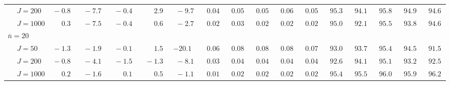 \begin{sidewaystable}
\begin{threeparttable}
\begin{tabular}{llccccccccccccccc}
 & \nopagebreak $\;J=200$  & $\phantom{0}{-}0.8\phantom{0}$ & $\phantom{0}{-}7.7\phantom{0}$ & $\phantom{0}{-}0.4\phantom{0}$ & $\phantom{0}\phantom{-}2.9\phantom{0}$ & $\phantom{0}{-}9.7\phantom{0}$ & $\phantom{0}0.04\phantom{0}$ & $\phantom{0}0.05\phantom{0}$ & $\phantom{0}0.05\phantom{0}$ & $\phantom{0}0.06\phantom{0}$ & $\phantom{0}0.05\phantom{0}$ & $\phantom{0}95.3\phantom{0}$ & $\phantom{0}94.1\phantom{0}$ & $\phantom{0}95.8\phantom{0}$ & $\phantom{0}94.9\phantom{0}$ & $\phantom{0}94.6\phantom{0}$ \\
 & \nopagebreak $\;J=1000$  & $\phantom{0}\phantom{-}0.3\phantom{0}$ & $\phantom{0}{-}7.5\phantom{0}$ & $\phantom{0}{-}0.4\phantom{0}$ & $\phantom{0}\phantom{-}0.6\phantom{0}$ & $\phantom{0}{-}2.7\phantom{0}$ & $\phantom{0}0.02\phantom{0}$ & $\phantom{0}0.03\phantom{0}$ & $\phantom{0}0.02\phantom{0}$ & $\phantom{0}0.02\phantom{0}$ & $\phantom{0}0.02\phantom{0}$ & $\phantom{0}95.0\phantom{0}$ & $\phantom{0}92.1\phantom{0}$ & $\phantom{0}95.5\phantom{0}$ & $\phantom{0}93.8\phantom{0}$ & $\phantom{0}94.6\phantom{0}$ \\
\multicolumn{4}{l}{$\bar{n}=20$} \\  & \nopagebreak $\;J=50$  & $\phantom{0}{-}1.3\phantom{0}$ & $\phantom{0}{-}1.9\phantom{0}$ & $\phantom{0}{-}0.1\phantom{0}$ & $\phantom{0}\phantom{-}1.5\phantom{0}$ & ${-}20.1\phantom{0}$ & $\phantom{0}0.06\phantom{0}$ & $\phantom{0}0.08\phantom{0}$ & $\phantom{0}0.08\phantom{0}$ & $\phantom{0}0.08\phantom{0}$ & $\phantom{0}0.07\phantom{0}$ & $\phantom{0}93.0\phantom{0}$ & $\phantom{0}93.7\phantom{0}$ & $\phantom{0}95.4\phantom{0}$ & $\phantom{0}94.5\phantom{0}$ & $\phantom{0}91.5\phantom{0}$ \\
 & \nopagebreak $\;J=200$  & $\phantom{0}{-}0.8\phantom{0}$ & $\phantom{0}{-}4.1\phantom{0}$ & $\phantom{0}{-}1.5\phantom{0}$ & $\phantom{0}{-}1.3\phantom{0}$ & $\phantom{0}{-}8.1\phantom{0}$ & $\phantom{0}0.03\phantom{0}$ & $\phantom{0}0.04\phantom{0}$ & $\phantom{0}0.04\phantom{0}$ & $\phantom{0}0.04\phantom{0}$ & $\phantom{0}0.04\phantom{0}$ & $\phantom{0}92.6\phantom{0}$ & $\phantom{0}94.1\phantom{0}$ & $\phantom{0}95.1\phantom{0}$ & $\phantom{0}93.2\phantom{0}$ & $\phantom{0}92.5\phantom{0}$ \\
 & \nopagebreak $\;J=1000$  & $\phantom{0}\phantom{-}0.2\phantom{0}$ & $\phantom{0}{-}1.6\phantom{0}$ & $\phantom{0}\phantom{-}0.1\phantom{0}$ & $\phantom{0}\phantom{-}0.5\phantom{0}$ & $\phantom{0}{-}1.1\phantom{0}$ & $\phantom{0}0.01\phantom{0}$ & $\phantom{0}0.02\phantom{0}$ & $\phantom{0}0.02\phantom{0}$ & $\phantom{0}0.02\phantom{0}$ & $\phantom{0}0.02\phantom{0}$ & $\phantom{0}95.4\phantom{0}$ & $\phantom{0}95.5\phantom{0}$ & $\phantom{0}96.0\phantom{0}$ & $\phantom{0}95.9\phantom{0}$ & $\phantom{0}96.2\phantom{0}$ \\

\end{tabular}
\end{threeparttable}
\end{sidewaystable}
